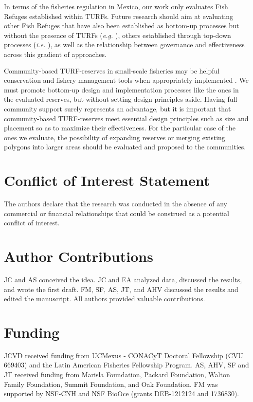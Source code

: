 \documentclass{frontiersSCNS}
\begin{document}
In terms of the fisheries regulation in Mexico, our work only evaluates
Fish Refuges established within TURFs. Future research should aim at
evaluating other Fish Refuges that have also been established as
bottom-up processes but without the presence of TURFs (\emph{e.g.}
\citet{dof_websiteC_2012}), others established through top-down
processes (\emph{i.e.} \citet{dof_websiteU_2018}), as well as the
relationship between governance and effectiveness across this gradient
of approaches.

Community-based TURF-reserves in small-scale fisheries may be helpful
conservation and fishery management tools when appropriately implemented
\citep{gelcich_2015}. We must promote bottom-up design and
implementation processes like the ones in the evaluated reserves, but
without setting design principles aside. Having full community support
surely represents an advantage, but it is important that community-based
TURF-reserves meet essential design principles such as size and
placement so as to maximize their effectiveness. For the particular case
of the ones we evaluate, the possibility of expanding reserves or
merging existing polygons into larger areas should be evaluated and
proposed to the communities.

\section*{Conflict of Interest Statement}

The authors declare that the research was conducted in the absence of
any commercial or financial relationships that could be construed as a
potential conflict of interest.

\section*{Author Contributions}

JC and AS conceived the idea. JC and EA analyzed data, discussed the
results, and wrote the first draft. FM, SF, AS, JT, and AHV discussed
the results and edited the manuscript. All authors provided valuable
contributions.

\section*{Funding}

JCVD received funding from UCMexus - CONACyT Doctoral Fellowship (CVU
669403) and the Latin American Fisheries Fellowship Program. AS, AHV, SF
and JT received funding from Marisla Foundation, Packard Foundation,
Walton Family Foundation, Summit Foundation, and Oak Foundation. FM was
supported by NSF-CNH and NSF BioOce (grants DEB-1212124 and 1736830).
\end{document}
